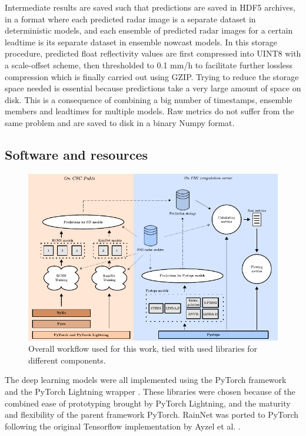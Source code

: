Intermediate results are saved such that predictions are saved in HDF5 archives, in a format where each predicted radar image is a separate dataset in deterministic models, and each ensemble of predicted radar images for a certain leadtime is its separate dataset in ensemble nowcast models. In this storage procedure, predicted float reflectivity values are first compressed into UINT8 with a scale-offset scheme, then thresholded to 0.1 mm/h to facilitate further lossless compression which is finally carried out using GZIP. Trying to reduce the storage space needed is essential because predictions take a very large amount of space on disk. This is a consequence of combining a big number of timestamps, ensemble members and leadtimes for multiple models. Raw metrics do not suffer from the same problem and are saved to disk in a binary Numpy format.  

\subsection{Software and resources}

\begin{figure}
	\centering
	\label{fig:workflow}
	\includegraphics[width=\textwidth]{images/workflow/workflow}
	\caption{Overall workflow used for this work, tied with used libraries for different components.}
\end{figure}

The deep learning models were all implemented using the PyTorch framework and the PyTorch Lightning wrapper \cite{Falcon_PyTorch_Lightning_2019}. These libraries were chosen because of the combined ease of prototyping brought by PyTorch Lightning, and the maturity and flexibility of the parent framework PyTorch. RainNet was ported to PyTorch following the original Tensorflow implementation by Ayzel et al. \cite{Ayzel2020RainNet}. 

